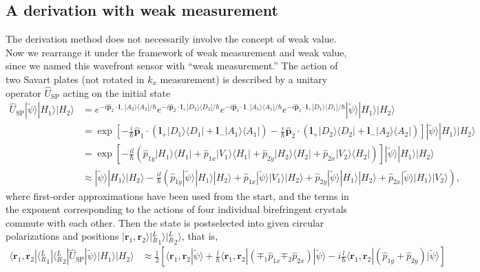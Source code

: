 \documentclass[pra,english,reprint,nofootinbib,aps,superscriptaddress,showpacs,showkeys]{revtex4-2}
\theoremstyle{definition}
\theoremstyle{remark}
\begin{document}
\begin{widetext}
		\section{A derivation with weak measurement}\label{appB}
		
		The derivation method does not necessarily involve the concept of weak value. Now we rearrange it under the framework of weak measurement and weak value, since we named this wavefront sensor with ``weak measurement.'' The action of two Savart plates (not rotated in $k_x$ measurement) is described by a unitary operator $\hat{U}_\textrm{SP}$ acting on the initial state
		\begin{align}
			\hat{U}_\textrm{SP}|\tilde{\psi}\rangle|H_1\rangle|H_2\rangle&=e^{-i\hat{\mathbf{p}}_2\cdot\mathbf{l}_-|A_2\rangle\langle A_2|/\hbar}
			e^{-i\hat{\mathbf{p}}_2\cdot\mathbf{l}_+|D_2\rangle\langle D_2|/\hbar}
			e^{-i\hat{\mathbf{p}}_1\cdot\mathbf{l}_-|A_1\rangle\langle A_1|/\hbar}
			e^{-i\hat{\mathbf{p}}_1\cdot\mathbf{l}_+|D_1\rangle\langle D_1|/\hbar}
			|\tilde{\psi}\rangle|H_1\rangle|H_2\rangle\nonumber\\
			&=\exp\left[-\frac{i}{\hbar}\hat{\mathbf{p}}_1\cdot\left(\mathbf{l}_+|D_1\rangle\langle D_1|+\mathbf{l}_-|A_1\rangle\langle A_1|\right)-\frac{i}{\hbar}\hat{\mathbf{p}}_2\cdot\left(\mathbf{l}_+|D_2\rangle\langle D_2|+\mathbf{l}_-|A_2\rangle\langle A_2|\right)\right]|\tilde{\psi}\rangle|H_1\rangle|H_2\rangle\nonumber\\
			&=\exp\left[-\frac{il}{\hbar}\left(\hat{p}_{1y}|H_1\rangle\langle H_1|+\hat{p}_{1x}|V_1\rangle\langle H_1|+\hat{p}_{2y}|H_2\rangle\langle H_2|+\hat{p}_{2x}|V_2\rangle\langle H_2|\right)\right]|\tilde{\psi}\rangle|H_1\rangle|H_2\rangle\nonumber\\
			&\approx|\tilde{\psi}\rangle|H_1\rangle|H_2\rangle-\frac{il}{\hbar}\left(\hat{p}_{1y}|\tilde{\psi}\rangle|H_1\rangle|H_2\rangle+\hat{p}_{1x}|\tilde{\psi}\rangle|V_1\rangle|H_2\rangle+\hat{p}_{2y}|\tilde{\psi}\rangle|H_1\rangle|H_2\rangle+\hat{p}_{2x}|\tilde{\psi}\rangle|H_1\rangle|V_2\rangle\right),
		\end{align}
		where first-order approximations have been used from the start, and the terms in the exponent corresponding to the actions of four individual birefringent crystals commute with each other. Then the state is postselected into given circular polarizations and positions $|\mathbf{r}_1,\mathbf{r}_2\rangle|{^L_R}_1\rangle|{^L_R}_2\rangle$, that is,
		\begin{align}
			\langle\mathbf{r}_1,\mathbf{r}_2|\langle{^L_R}_1|\langle{^L_R}_2|\hat{U}_\textrm{SP}|\tilde{\psi}\rangle|H_1\rangle|H_2\rangle&\approx\frac{1}{2}\left[\langle\mathbf{r}_1,\mathbf{r}_2|\tilde{\psi}\rangle+\frac{l}{\hbar}\langle\mathbf{r}_1,\mathbf{r}_2|(\mp_1 \hat{p}_{1x}\mp_2 \hat{p}_{2x})|\tilde{\psi}\rangle-i\frac{l}{\hbar}\langle\mathbf{r}_1,\mathbf{r}_2|(\hat{p}_{1y}+\hat{p}_{2y})|\tilde{\psi}\rangle\right]\nonumber\\

\end{align}
\end{widetext}
\end{document}
